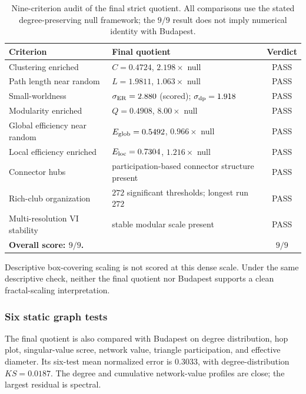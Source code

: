 \documentclass[12pt]{article}
\begin{document}
\begin{table}[H]
\centering
\small
\begin{tabularx}{\textwidth}{p{}Xc}
\toprule
Criterion & Final quotient & Verdict\\
\midrule
Clustering enriched & \(C=0.4724\), \(2.198\times\) null & PASS\\
Path length near random & \(L=1.9811\), \(1.063\times\) null & PASS\\
Small-worldness & \(\sigma_{\rm ER}=2.880\) (scored); \(\sigma_{\rm dp}=1.918\) & PASS\\
Modularity enriched & \(Q=0.4908\), \(8.00\times\) null & PASS\\
Global efficiency near random & \(E_{\rm glob}=0.5492\), \(0.966\times\) null & PASS\\
Local efficiency enriched & \(E_{\rm loc}=0.7304\), \(1.216\times\) null & PASS\\
Connector hubs & participation-based connector structure present & PASS\\
Rich-club organization & \(272\) significant thresholds; longest run \(272\) & PASS\\
Multi-resolution VI stability & stable modular scale present & PASS\\
\midrule
\multicolumn{2}{l}{\textbf{Overall score: \(9/9\).}} & \(9/9\)\\
\bottomrule
\end{tabularx}
\caption{Nine-criterion audit of the final strict quotient.  All comparisons use the stated degree-preserving null framework; the \(9/9\) result does not imply numerical identity with Budapest.}
\label{tab:final-quotient-audit}
\end{table}

Descriptive box-covering scaling is not scored at this dense scale.  Under the
same descriptive check, neither the final quotient nor Budapest supports a
clean fractal-scaling interpretation.

\subsubsection{Six static graph tests}
The final quotient is also compared with Budapest on degree distribution, hop
plot, singular-value scree, network value, triangle participation, and
effective diameter.  Its six-test mean normalized error is \(0.3033\), with
degree-distribution \(KS=0.0187\).  The degree and cumulative network-value
profiles are close; the largest residual is spectral.
\end{document}
